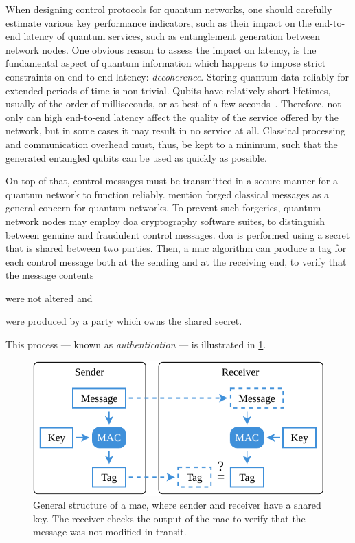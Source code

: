When designing control protocols for quantum networks, one should carefully estimate various key
performance indicators, such as their impact on the end-to-end latency of quantum services, such as
entanglement generation between network nodes. One obvious reason to assess the impact on latency,
is the fundamental aspect of quantum information which happens to impose strict constraints on
end-to-end latency: \emph{decoherence}. Storing quantum data reliably for extended periods of time
is non-trivial. Qubits have relatively short lifetimes, usually of the order of milliseconds, or at
best of a few seconds~\cite{abobeih_2018_one_sec, bradley_2019_one_min}. Therefore, not only can
high end-to-end latency affect the quality of the service offered by the network, but in some cases
it may result in no service at all. Classical processing and communication overhead must, thus, be
kept to a minimum, such that the generated entangled qubits can be used as quickly as possible.

On top of that, control messages must be transmitted in a secure manner for a quantum network to
function reliably. \textcite{satoh_2020_attacking} mention forged classical messages as a general
concern for quantum networks. To prevent such forgeries, quantum network nodes may employ
\acrfull{doa} cryptography software suites, to distinguish between genuine and fraudulent control
messages. \acrshort{doa} is performed using a secret that is shared between two parties. Then, a
\acrfull{mac} algorithm can produce a tag for each control message both at the sending and at the
receiving end, to verify that the message contents
%
\begin{inlinelist}
    \item were not altered and
    \item were produced by a party which owns the shared secret.
\end{inlinelist}
This process --- known as \emph{authentication} --- is illustrated in \cref{fig:mac-structure}.

\begin{figure}[t]
    \centering
    \includegraphics[width=0.6\linewidth]{figures/mac-structure.pdf}
    \caption{
        General structure of a \acrfull{mac}, where sender and receiver have a shared key. The
        receiver checks the output of the \acrshort{mac} to verify that the message was not modified
        in transit.
    }
    \label{fig:mac-structure}
\end{figure}

